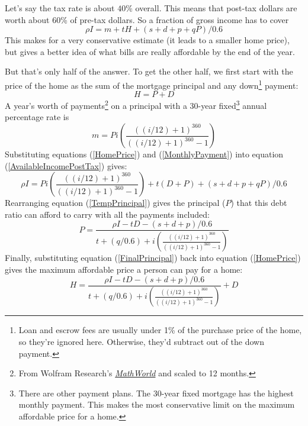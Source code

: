 \documentclass{article}
\begin{document}
Let's say the tax rate is about $40$\% overall. This means that 
post-tax dollars are worth about $60$\% of pre-tax dollars.
So a fraction of gross income has to cover
\begin{equation}
\label{AvailableIncomePostTax}
\rho I = m + tH + (s + d + p + qP) / 0.6
\end{equation}
This makes for a very conservative estimate (it 
leads to a smaller home price), but gives a better idea of what 
bills are really affordable by the end of the year.

\pagebreak

But that's only half of the answer. To get the other half, we first
 start with the 
price of the home as the sum of the mortgage principal and any
 down\footnote{
Loan and escrow fees are usually under 1\% of the purchase price of
 the home, so 
they're ignored here. Otherwise, they'd subtract out of the down
 payment.} payment:
\begin{equation}
\label{HomePrice}
H = P + D
\end{equation}
A year's worth of payments\footnote{From Wolfram Research's 
\href{http://mathworld.wolfram.com/Mortgage.html}{\emph{MathWorld}} 
and scaled to 12 months.} on
a principal with a 30-year fixed\footnote{
There are other payment plans. The 30-year fixed mortgage has the
 highest monthly payment. This makes the most conservative limit 
on the maximum affordable price for a home.} annual percentage 
rate is
\begin{equation}
\label{MonthlyPayment}
m = Pi \left( \frac{((i/12) + 1)^{360}}{((i/12) + 1)^{360} - 1} \right)
\end{equation}
Substituting equations (\ref{HomePrice}) and (\ref{MonthlyPayment}) into 
equation (\ref{AvailableIncomePostTax}) gives:
\begin{equation}
\label{TempPrincipal}
\rho I = P i \left( \frac{((i/12) + 1)^{360}}{((i/12) + 1)^{360} - 1} \right)
+ t(D + P) + (s + d + p + qP) / 0.6
\end{equation}
Rearranging equation (\ref{TempPrincipal}) gives the principal ($P$) that 
this debt ratio can afford to carry with all the payments included:
\begin{equation}
\label{FinalPrincipal}
P = \frac{\rho I - tD - (s + d + p) / 0.6}{t + (q / 0.6) +
i \left( \frac{((i/12) + 1)^{360}}{((i/12) + 1)^{360} - 1} \right)}
\end{equation}
Finally, substituting equation (\ref{FinalPrincipal}) back into equation
 (\ref{HomePrice}) gives the maximum affordable price a person can pay 
for a home:
\begin{equation}
\label{FinalHomePrice}
H = \frac{\rho I - tD - (s + d + p) / 0.6}{t + (q / 0.6) +
i \left( \frac{((i/12) + 1)^{360}}{((i/12) + 1)^{360} - 1} \right)} + D
\end{equation}
\end{document}
